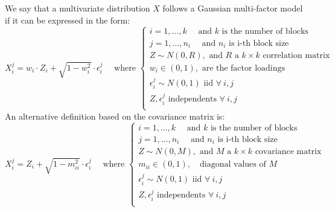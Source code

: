 \documentclass[11pt,fleqn]{book} %
\begin{document}
\begin{definition}
	\label{def:gmfm}
	We say that a multivariate distribution $X$ follows a Gaussian multi-factor
	model if it can be expressed in the form:
	\begin{displaymath}
		X_i^j = w_i \cdot Z_i + \sqrt{1-w_i^2} \cdot \epsilon_i^j
		\quad \text{ where } \left\{
		\begin{array}{l}
			i = 1, \dots, k \quad \text{ and $k$ is the number of blocks}    \\
			j = 1, \dots, n_i \quad \text{ and $n_i$ is i-th block size}     \\
			Z \sim N(0,R), \text{ and $R$ a $k {\times} k$ correlation matrix} \\
			w_i \in (0,1), \text{ are the factor loadings }                  \\
			\epsilon_i^j \sim N(0,1) \text { iid } \forall\ i,j               \\
			Z, \epsilon_i^j \text{ independents } \forall\ i,j                \\
		\end{array}
		\right.
	\end{displaymath}
	An alternative definition based on the covariance matrix is:
	\begin{displaymath}
		X_i^j = Z_i + \sqrt{1-m_{ii}^2} \cdot \epsilon_i^j
		\quad \text{ where } \left\{
		\begin{array}{l}
			i = 1, \dots, k \quad \text{ and $k$ is the number of blocks}    \\
			j = 1, \dots, n_i \quad \text{ and $n_i$ is i-th block size}     \\
			Z \sim N(0,M), \text{ and $M$ a $k {\times} k$ covariance matrix} \\
			m_{ii} \in (0,1), \quad \text{diagonal values of $M$}            \\
			\epsilon_i^j \sim N(0,1) \text { iid } \forall\ i,j               \\
			Z, \epsilon_i^j \text{ independents } \forall\ i,j                \\
		\end{array}
		\right.
	\end{displaymath}
\end{definition}
\end{document}
